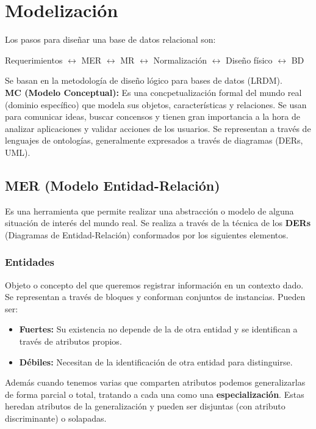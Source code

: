 \section*{Modelización}
Los pasos para diseñar una base de datos relacional son:
\begin{center}
    Requerimientos $\leftrightarrow$ MER $\leftrightarrow$ MR $\leftrightarrow$ Normalización $\leftrightarrow$ Diseño físico $\leftrightarrow$ BD
\end{center}
Se basan en la metodología de diseño lógico para bases de datos (LRDM). \\
\textbf{MC (Modelo Conceptual):} Es una concpetualización formal del mundo real (dominio específico) que modela sus objetos, características y relaciones. Se usan para comunicar ideas, buscar concensos y tienen gran importancia a la hora de analizar aplicaciones y validar acciones de los usuarios. Se representan a través de lenguajes de ontologías, generalmente expresados a través de diagramas (DERs, UML).

\subsection*{MER (Modelo Entidad-Relación)}
Es una herramienta que permite realizar una abstracción o modelo de alguna situación de interés del mundo real. Se realiza a través de la técnica de los \textbf{DERs} (Diagramas de Entidad-Relación) conformados por los siguientes elementos.

\subsubsection*{Entidades}
Objeto o concepto del que queremos registrar información en un contexto dado. Se representan a través de bloques y conforman conjuntos de instancias. Pueden ser:
\begin{itemize}
    \item \textbf{Fuertes:} Su existencia no depende de la de otra entidad y se identifican a través de atributos propios.
    \item \textbf{Débiles:} Necesitan de la identificación de otra entidad para distinguirse.
\end{itemize}
Además cuando tenemos varias que comparten atributos podemos generalizarlas de forma parcial o total, tratando a cada una como una \textbf{especialización}. Estas heredan atributos de la generalización y pueden ser disjuntas (con atributo discriminante) o solapadas.

